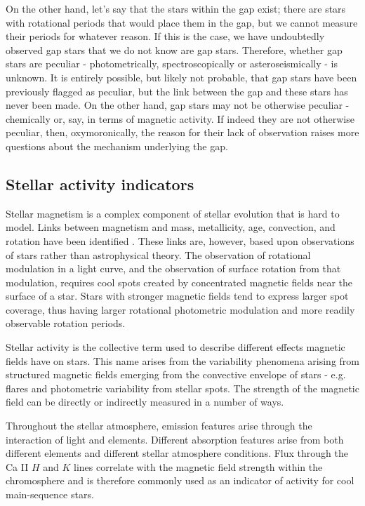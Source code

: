 On the other hand, let's say that the stars within the gap exist; there are stars with rotational periods that would place them in the gap, but we cannot measure their periods for whatever reason.
If this is the case, we have undoubtedly observed gap stars that we do not know are gap stars.
Therefore, whether gap stars are peculiar - photometrically, spectroscopically or asteroseismically - is unknown.
It is entirely possible, but likely not probable, that gap stars have been previously flagged as peculiar, but the link between the gap and these stars has never been made.
On the other hand, gap stars may not be otherwise peculiar - chemically or, say, in terms of magnetic activity.
If indeed they are not otherwise peculiar, then, oxymoronically, the reason for their lack of observation raises more questions about the mechanism underlying the gap.

\subsection{Stellar activity indicators}

Stellar magnetism is a complex component of stellar evolution that is hard to model.
Links between magnetism and mass, metallicity, age, convection, and rotation have been identified \citep{cao_starspots_2022}.
These links are, however, based upon observations of stars rather than astrophysical theory.
The observation of rotational modulation in a light curve, and the observation of surface rotation from that modulation, requires cool spots created by concentrated magnetic fields near the surface of a star.
Stars with stronger magnetic fields tend to express larger spot coverage, thus having larger rotational photometric modulation and more readily observable rotation periods.

Stellar activity is the collective term used to describe different effects magnetic fields have on stars.
This name arises from the variability phenomena arising from structured magnetic fields emerging from the convective envelope of stars - e.g. flares and photometric variability from stellar spots.
The strength of the magnetic field can be directly or indirectly measured in a number of ways.

Throughout the stellar atmosphere, emission features arise through the interaction of light and elements. 
Different absorption features arise from both different elements and different stellar atmosphere conditions. 
Flux through the Ca II $H$ and $K$ lines correlate with the magnetic field strength within the chromosphere and is therefore commonly used as an indicator of activity for cool main-sequence stars.

